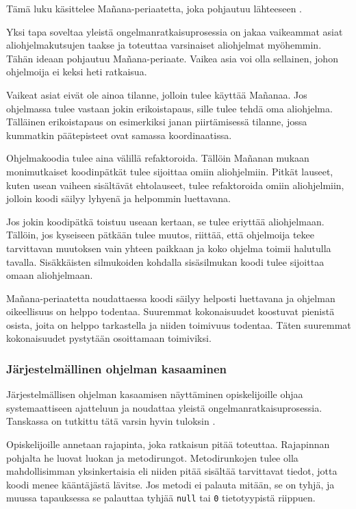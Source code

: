 Tämä luku käsittelee Mañana-periaatetta, joka pohjautuu lähteeseen
\cite{Caspersen:2006:NPO:1176617.1176741}.

Yksi tapa soveltaa yleistä ongelmanratkaisuprosessia on jakaa vaikeammat asiat
aliohjelmakutsujen taakse ja toteuttaa varsinaiset aliohjelmat myöhemmin. Tähän
ideaan pohjautuu Mañana-periaate. Vaikea asia voi olla sellainen, johon
ohjelmoija ei keksi heti ratkaisua.

Vaikeat asiat eivät ole ainoa tilanne, jolloin tulee käyttää Mañanaa. Jos
ohjelmassa tulee vastaan jokin erikoistapaus, sille tulee tehdä oma aliohjelma.
Tälläinen erikoistapaus on esimerkiksi janan piirtämisessä tilanne, jossa
kummatkin päätepisteet ovat samassa koordinaatissa.

Ohjelmakoodia tulee aina välillä refaktoroida. Tällöin Mañanan mukaan
monimutkaiset koodinpätkät tulee sijoittaa omiin aliohjelmiin. Pitkät lauseet,
kuten usean vaiheen sisältävät ehtolauseet, tulee refaktoroida omiin
aliohjelmiin, jolloin koodi säilyy lyhyenä ja helpommin luettavana.

Jos jokin koodipätkä toistuu useaan kertaan, se tulee eriyttää aliohjelmaan.
Tällöin, jos kyseiseen pätkään tulee muutos, riittää, että ohjelmoija tekee
tarvittavan muutoksen vain yhteen paikkaan ja koko ohjelma toimii halutulla
tavalla. Sisäkkäisten silmukoiden kohdalla sisäsilmukan koodi tulee sijoittaa
omaan aliohjelmaan.

Mañana-periaatetta noudattaessa koodi säilyy helposti luettavana ja ohjelman
oikeellisuus on helppo todentaa. Suuremmat kokonaisuudet koostuvat pienistä
osista, joita on helppo tarkastella ja niiden toimivuus todentaa. Täten
suuremmat kokonaisuudet pystytään osoittamaan toimiviksi.

\subsubsection{Järjestelmällinen ohjelman kasaaminen}

\label{järjestelmällisyyteen pohjautuva ongelmanratkaisuprosessi}

Järjestelmällisen ohjelman kasaamisen näyttäminen opiskelijoille ohjaa
systemaattiseen ajatteluun ja noudattaa yleistä ongelmanratkaisuprosessia.
Tanskassa on tutkittu tätä varsin hyvin tuloksin
\cite{Caspersen:2006:NPO:1176617.1176741}.

Opiskelijoille annetaan rajapinta, joka ratkaisun pitää toteuttaa. Rajapinnan
pohjalta he luovat luokan ja metodirungot. Metodirunkojen tulee olla
mahdollisimman yksinkertaisia eli niiden pitää sisältää tarvittavat tiedot,
jotta koodi menee kääntäjästä lävitse. Jos metodi ei palauta mitään, se on
tyhjä, ja muussa tapauksessa se palauttaa tyhjää \texttt{null} tai \texttt{0}
tietotyypistä riippuen.

